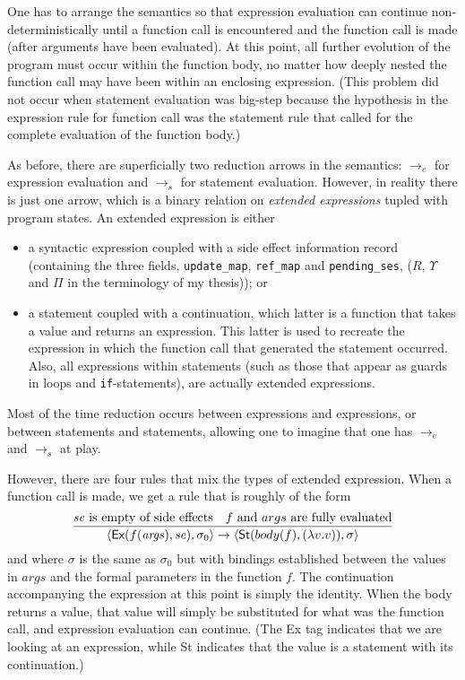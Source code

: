 \documentclass[11pt]{article}
\begin{document}
One has to arrange the semantics so that expression evaluation can
continue non-deterministically until a function call is encountered
and the function call is made (after arguments have been evaluated).
At this point, all further evolution of the program must occur within
the function body, no matter how deeply nested the function call may
have been within an enclosing expression.  (This problem did not occur
when statement evaluation was big-step because the hypothesis in the
expression rule for function call was the statement rule that called
for the complete evaluation of the function body.)

As before, there are superficially two reduction arrows in the
semantics: $\rightarrow_e$ for expression evaluation and
$\rightarrow_s$ for statement evaluation.  However, in reality there
is just one arrow, which is a binary relation on \emph{extended
  expressions} tupled with program states.  An extended expression is
either
\begin{itemize}
\item a syntactic expression coupled with a side effect information
  record (containing the three fields, \texttt{update\_map},
  \texttt{ref\_map} and \texttt{pending\_ses}, ($R$, $\Upsilon$ and
  $\Pi$ in the terminology of my thesis)); or
\item a statement coupled with a continuation, which latter is a
  function that takes a value and returns an expression.  This latter
  is used to recreate the expression in which the function call
  that generated the statement occurred.  Also, all expressions within
  statements (such as those that appear as guards in loops and
  \texttt{if}-statements), are actually extended expressions.
\end{itemize}
Most of the time reduction occurs between expressions and expressions,
or between statements and statements, allowing one to imagine that one
has $\rightarrow_e$ and $\rightarrow_s$ at play.

However, there are four rules that mix the types of extended
expression.  When a function call is made, we get a rule that is
roughly of the form
\[
\infer{
   \langle \textsf{Ex}(f(\mathit{args}), \mathit{se}), \sigma_0\rangle  \rightarrow
   \langle \textsf{St}(body(f), (\lambda v.v)), \sigma\rangle
}{\mathit{se} \mbox{ is empty of side effects} &
  \mbox{$f$ and $args$ are fully evaluated}}
\]
and where $\sigma$ is the same as $\sigma_0$ but with bindings
established between the values in $\mathit{args}$ and the formal
parameters in the function $f$.  The continuation accompanying the
expression at this point is simply the identity.  When the body
returns a value, that value will simply be substituted for what was
the function call, and expression evaluation can continue.  (The
\textsf{Ex} tag indicates that we are looking at an expression, while
\textsf{St} indicates that the value is a statement with its continuation.)
\end{document}
